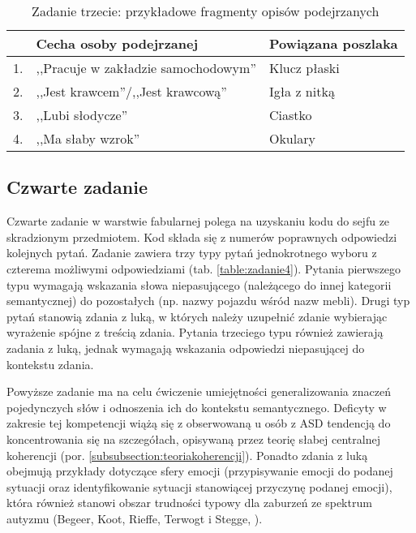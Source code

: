    \begin{table}
        \caption{Zadanie trzecie: przykładowe fragmenty opisów podejrzanych}
        \label{table:zadanie3}
        \begin{tabularx}{\textwidth}{ l X X }
         \hline
        
         \hline
          & \textbf{Cecha osoby podejrzanej} & \textbf{Powiązana poszlaka} \\
          \hline
         1. & ,,Pracuje w zakładzie samochodowym'' & Klucz płaski \\
         2. & ,,Jest krawcem''/,,Jest krawcową'' & Igła z nitką \\
         3. & ,,Lubi słodycze'' & Ciastko \\
         4. & ,,Ma słaby wzrok'' & Okulary \\
         \hline
         
         \hline
        \end{tabularx}
    \end{table}
    
    \subsection{Czwarte zadanie}
    Czwarte zadanie w warstwie fabularnej polega na uzyskaniu kodu do sejfu ze skradzionym przedmiotem.
    Kod składa się z numerów poprawnych odpowiedzi kolejnych pytań.
    Zadanie zawiera trzy typy pytań jednokrotnego wyboru z czterema możliwymi odpowiedziami (tab. \ref{table:zadanie4}).
    Pytania pierwszego typu wymagają wskazania słowa niepasującego (należącego do innej kategorii semantycznej) do pozostałych (np. nazwy pojazdu wśród nazw mebli).
    Drugi typ pytań stanowią zdania z luką, w których należy uzupełnić zdanie wybierając wyrażenie spójne z treścią zdania.
    Pytania trzeciego typu również zawierają zadania z luką, jednak wymagają wskazania odpowiedzi niepasującej do kontekstu zdania.
    
    Powyższe zadanie ma na celu ćwiczenie umiejętności generalizowania znaczeń pojedynczych słów i odnoszenia ich do kontekstu semantycznego.
    Deficyty w zakresie tej kompetencji wiążą się z obserwowaną u osób z ASD tendencją do koncentrowania się na szczegółach, opisywaną przez teorię słabej centralnej koherencji (por. \ref{subsubsection:teoriakoherencji}).
    Ponadto zdania z luką obejmują przykłady dotyczące sfery emocji (przypisywanie emocji do podanej sytuacji oraz identyfikowanie sytuacji stanowiącej przyczynę podanej emocji), która również stanowi obszar trudności typowy dla zaburzeń ze spektrum autyzmu (Begeer, Koot, Rieffe, Terwogt i Stegge, \cite*{begeer2008emotional}).
    
